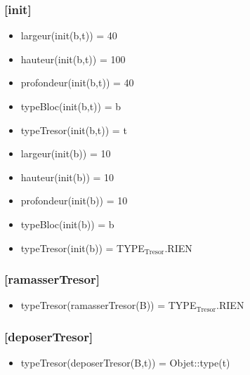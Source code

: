 \documentclass[11pt]{article}
\begin{document}
\subsubsection{[init]}
\label{sec-1.7.2}

\begin{itemize}

\item largeur(init(b,t)) = 40\\
\label{sec-1.7.2.1}


\item hauteur(init(b,t)) = 100\\
\label{sec-1.7.2.2}


\item profondeur(init(b,t)) = 40\\
\label{sec-1.7.2.3}


\item typeBloc(init(b,t)) = b\\
\label{sec-1.7.2.4}


\item typeTresor(init(b,t)) = t\\
\label{sec-1.7.2.5}



\item largeur(init(b)) = 10\\
\label{sec-1.7.2.6}


\item hauteur(init(b)) = 10\\
\label{sec-1.7.2.7}


\item profondeur(init(b)) = 10\\
\label{sec-1.7.2.8}


\item typeBloc(init(b)) = b\\
\label{sec-1.7.2.9}


\item typeTresor(init(b)) = TYPE$_{\mathrm{Tresor}}$.RIEN\\
\label{sec-1.7.2.10}


\end{itemize} %
\subsubsection{[ramasserTresor]}
\label{sec-1.7.3}

\begin{itemize}

\item typeTresor(ramasserTresor(B)) = TYPE$_{\mathrm{Tresor}}$.RIEN\\
\label{sec-1.7.3.1}


\end{itemize} %
\subsubsection{[deposerTresor]}
\label{sec-1.7.4}

\begin{itemize}

\item typeTresor(deposerTresor(B,t)) = Objet::type(t)\\
\label{sec-1.7.4.1}


\end{itemize} %
\end{document}
